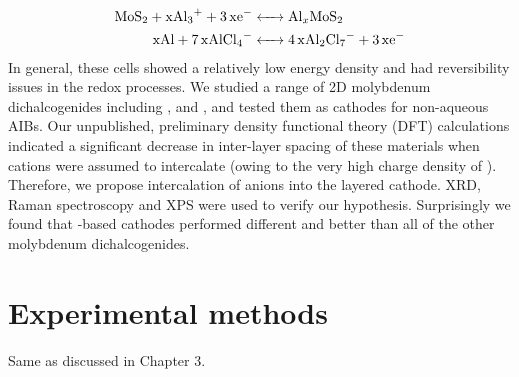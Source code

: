 \begin{align*}
    \ce{MoS2 + x\ce{Al3+}  + 3x\ce{e-} &<-> Al_xMoS2}\\
    \ce{xAl + 7x\ce{AlCl4-} &<-> 4x\ce{Al2Cl7-} + 3x\ce{e-}}
\end{align*}
In general, these cells showed a relatively low energy density and had reversibility issues in the redox processes.
We studied a range of 2D molybdenum dichalcogenides including ,  and , and tested them as cathodes for non-aqueous AIBs. Our unpublished, preliminary density functional theory (DFT) calculations indicated a significant decrease in inter-layer spacing of these materials when  cations were assumed to intercalate (owing to the very high charge density of ). Therefore, we propose intercalation of  anions into the layered cathode. XRD, Raman spectroscopy and XPS were used to verify our hypothesis. Surprisingly we found that -based cathodes performed different and better than all of the other molybdenum dichalcogenides.
\section{Experimental methods}
Same as discussed in Chapter 3.
